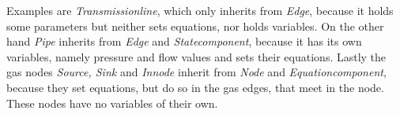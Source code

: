 \documentclass[a4paper]{article}
\begin{document}
Examples are \emph{Transmissionline}, which only inherits from \emph{Edge},
because it holds some parameters but neither sets equations, nor holds
variables. On the other hand \emph{Pipe} inherits from \emph{Edge} and
\emph{Statecomponent}, because it has its own variables, namely pressure and
flow values and sets their equations. Lastly the gas nodes \emph{Source, Sink}
and \emph{Innode} inherit from \emph{Node} and \emph{Equationcomponent}, because
they set equations, but do so in the gas edges, that meet in the node. These
nodes have no variables of their own.
\end{document}
